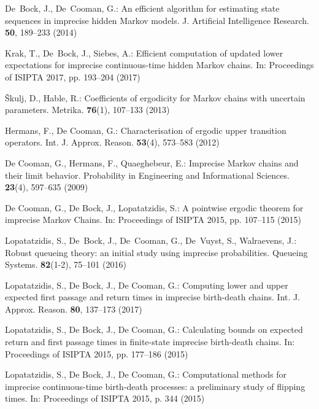 \begin{thebibliography}{99.}
De~Bock, J., De~Cooman, G.: {An efficient algorithm for estimating state sequences in imprecise hidden Markov models}. J. Artificial Intelligence Research. \textbf{50}, 189--233 (2014)

Krak, T., De~Bock, J., Siebes, A.: {Efficient computation of updated lower expectations for imprecise continuous-time hidden {M}arkov chains}. In: Proceedings of ISIPTA 2017, pp. 193--204 (2017)


{\v{S}}kulj, D., Hable, R.: {Coefficients of ergodicity for Markov chains with uncertain parameters}. Metrika. \textbf{76}(1), 107--133 (2013)

Hermans, F., De Cooman, G.: {Characterisation of ergodic upper transition operators}. Int. J. Approx. Reason. \textbf{53}(4), 573--583 (2012)

De Cooman, G., Hermans, F., Quaeghebeur, E.: {Imprecise Markov chains and their limit behavior}. Probability in Engineering and Informational Sciences. \textbf{23}(4), 597--635 (2009)

De Cooman, G., De Bock, J., Lopatatzidis, S.: {A pointwise ergodic theorem for imprecise Markov Chains}. In: Proceedings of ISIPTA 2015, pp. 107--115 (2015) 


Lopatatzidis, S., De~Bock, J., De~Cooman, G., De~Vuyst, S., Walraevens, J.: {Robust queueing theory: an initial study using imprecise probabilities}. Queueing Systems. \textbf{82}(1-2), 75--101 (2016)

Lopatatzidis, S., De Bock, J., De Cooman, G.: {Computing lower and upper expected first passage and return times in imprecise birth-death chains}. Int. J. Approx. Reason. \textbf{80}, 137--173 (2017) 

Lopatatzidis, S., De Bock, J., De Cooman, G.: {Calculating bounds on expected return and first passage times in finite-state imprecise birth-death chains}. In: Proceedings of ISIPTA 2015, pp. 177--186 (2015)

Lopatatzidis, S., De Bock, J., De Cooman, G.: {Computational methods for imprecise continuous-time birth-death processes: a preliminary study of flipping times}. In: Proceedings of ISIPTA 2015, p. 344 (2015)


\end{thebibliography}
